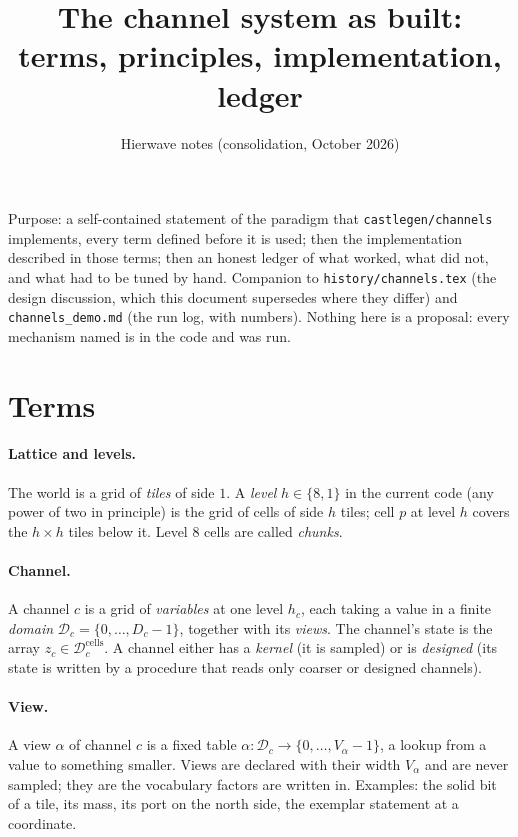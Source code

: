 \documentclass[11pt]{article}
\title{The channel system as built: terms, principles, implementation, ledger}
\author{Hierwave notes (consolidation, October 2026)}
\date{}
\newcommand{\1}{\mathds{1}}
\newcommand{\Dom}{\mathcal{D}}
\newcommand{\code}[1]{\texttt{#1}}
\begin{document}
\sloppy
\maketitle

\noindent Purpose: a self-contained statement of the paradigm that
\code{castlegen/channels} implements, every term defined before it is used;
then the implementation described in those terms; then an honest ledger of
what worked, what did not, and what had to be tuned by hand. Companion to
\code{history/channels.tex} (the design discussion, which this document supersedes
where they differ) and \code{channels\_demo.md} (the run log, with numbers).
Nothing here is a proposal: every mechanism named is in the code and was run.

\section{Terms}
\label{sec:terms}

\paragraph{Lattice and levels.} The world is a grid of \emph{tiles} of side
$1$. A \emph{level} $h \in \{8, 1\}$ in the current code (any power of two in
principle) is the grid of cells of side $h$ tiles; cell $p$ at level $h$
covers the $h \times h$ tiles below it. Level $8$ cells are called
\emph{chunks}.

\paragraph{Channel.} A channel $c$ is a grid of \emph{variables} at one
level $h_c$, each taking a value in a finite \emph{domain} $\Dom_c =
\{0, \dots, D_c - 1\}$, together with its \emph{views}. The channel's state is
the array $z_c \in \Dom_c^{\text{cells}}$. A channel either has a
\emph{kernel} (it is sampled) or is \emph{designed} (its state is written
by a procedure that reads only coarser or designed channels).

\paragraph{View.} A view $\alpha$ of channel $c$ is a fixed table
$\alpha: \Dom_c \to \{0, \dots, V_\alpha - 1\}$, a lookup from a value to
something smaller. Views are declared with their width $V_\alpha$ and are
never sampled; they are the vocabulary factors are written in. Examples:
the solid bit of a tile, its mass, its port on the north side, the
exemplar statement at a coordinate.
\end{document}
